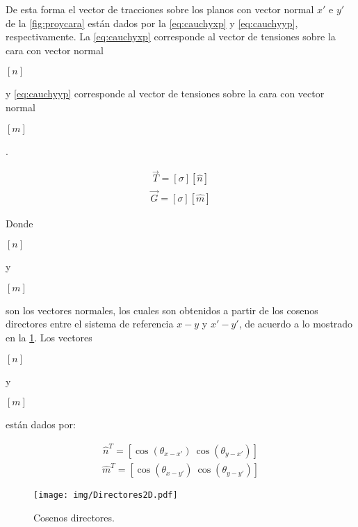 \documentclass[12pt,letterpaper, twoside, openany]{article}
\begin{document}
De esta forma el vector de tracciones sobre los planos con vector normal $x'$ e $y'$ de la \cref{fig:proycara} están dados por la \cref {eq:cauchyxp} y  \cref {eq:cauchyyp}, respectivamente. La \cref{eq:cauchyxp} corresponde al vector de tensiones sobre la cara con vector normal \begin{large} $\left[n \right]$\end{large} y \cref{eq:cauchyyp} corresponde al vector de tensiones sobre la cara con vector normal \begin{large} $\left[ m \right]$\end{large}. 
%
\begin{large}
	\begin{align}
		\overset{\rightarrow}{T}=\left[ \sigma \right] \left[\hat{n}\right]
		\label{eq:cauchyxp}
	\end{align}
%	
	\begin{align}
		\overset{\rightarrow}{G}=\left[ \sigma \right] \left[\hat{m}\right]
		\label{eq:cauchyyp}
	\end{align}
\end{large}
%
Donde \begin{large} $\left[ n \right]$\end{large}  y \begin{large} $\left[ m \right]$\end{large} son los vectores normales, los cuales son obtenidos a partir de los cosenos directores entre el sistema de referencia $x-y$ y $x'-y'$, de acuerdo a lo mostrado en la \cref{fig:directores2D}. Los vectores \begin{large} $\left[ n \right]$\end{large}  y \begin{large} $\left[ m \right]$\end{large} están dados por: 
%
\begin{large}
	\begin{align}
		\hat{n}^T=\left[ \cos \left( \theta_{x-x'} \right)\ \cos \left( \theta_{y-x'} \right)\right]
		\label{eq:normaln}
	\end{align}
	\begin{align}
		\hat{m}^T=\left[ \cos \left( \theta_{x-y'} \right)\ \cos \left( \theta_{y-y'} \right)\right]
		\label{eq:normalm}
	\end{align}
\end{large}
%
\begin{figure}[H]
	\centering
		\texttt{[image: img/Directores2D.pdf]}
		\caption{Cosenos directores.}
		\label{fig:directores2D}
\end{figure}
\end{document}
